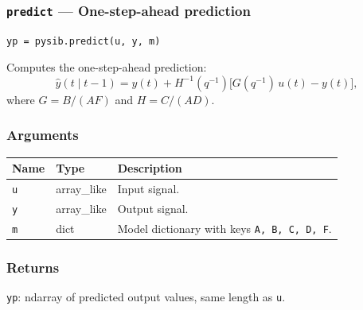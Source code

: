 \documentclass[../main]{subfiles}
\begin{document}
\newpage

\subsubsection{\texttt{predict} --- One-step-ahead prediction}

\begin{lstlisting}
yp = pysib.predict(u, y, m)
\end{lstlisting}

Computes the one-step-ahead prediction:
\[
  \hat{y}(t \mid t-1) = y(t) + H^{-1}(q^{-1})
  \bigl[ G(q^{-1})\,u(t) - y(t) \bigr],
\]
where $G = B/(AF)$ and $H = C/(AD)$.

\subsubsection*{Arguments}
\begin{center}
\begin{tabular}{lll}
  \toprule
  Name & Type & Description \\
  \midrule
  \texttt{u} & array\_like & Input signal. \\
  \texttt{y} & array\_like & Output signal. \\
  \texttt{m} & dict & Model dictionary with keys \texttt{A, B, C, D, F}. \\
  \bottomrule
\end{tabular}
\end{center}

\subsubsection*{Returns}
\texttt{yp}: ndarray of predicted output values, same length as \texttt{u}.
\end{document}
